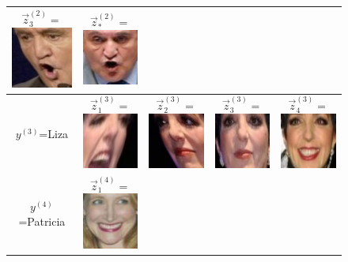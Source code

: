 \begin{figure}
\begin{tabular}{|c|ccc|c|}
  $\vec{z}_3^{(2)} = $\includegraphics[scale = 0.2]{../../proposal/face_photos/Jean-Pierre_Raffarin_0003.png} &  
  $\vec{z}_*^{(2)} = $\includegraphics[scale = 0.2]{../../proposal/face_photos/Jean-Pierre_Raffarin_0004.png} \\ \hline
$y^{(3)}$=Liza & 
  $\vec{z}_1^{(3)} = $\includegraphics[scale = 0.2]{../../proposal/face_photos/Liza_Minnelli_0001.png} &  
  $\vec{z}_2^{(3)} = $\includegraphics[scale = 0.2]{../../proposal/face_photos/Liza_Minnelli_0002.png} &  
  $\vec{z}_3^{(3)} = $\includegraphics[scale = 0.2]{../../proposal/face_photos/Liza_Minnelli_0003.png} &  
  $\vec{z}_4^{(3)} = $\includegraphics[scale = 0.2]{../../proposal/face_photos/Liza_Minnelli_0004.png} \\ \hline
$y^{(4)}$=Patricia & 
  $\vec{z}_1^{(4)} = $\includegraphics[scale = 0.2]{../../proposal/face_photos/Patricia_Clarkson_0001.png} &  

\end{tabular}
\end{figure}
